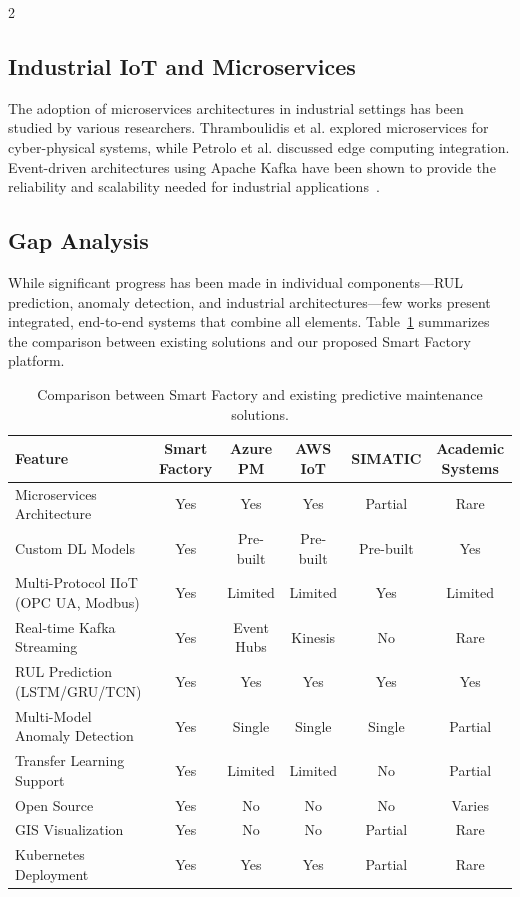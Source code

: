 \documentclass{ijceds} %
\begin{document}
\begin{multicols}{2}
\subsection{Industrial IoT and Microservices}

The adoption of microservices architectures in industrial settings has been studied by various researchers. Thramboulidis et al.\cite{thramboulidis2018cyberphysical} explored microservices for cyber-physical systems, while Petrolo et al.\cite{petrolo2017towards} discussed edge computing integration. Event-driven architectures using Apache Kafka have been shown to provide the reliability and scalability needed for industrial applications~\cite{confluent2021kafka}.

\subsection{Gap Analysis}

While significant progress has been made in individual components—RUL prediction, anomaly detection, and industrial architectures—few works present integrated, end-to-end systems that combine all elements. Table~\ref{tab:comparison} summarizes the comparison between existing solutions and our proposed Smart Factory platform.

\begin{table}[t]
\centering
\caption{Comparison between Smart Factory and existing predictive maintenance solutions.}
\label{tab:comparison}
\scriptsize
\begin{tabular}{|p{4.5cm}|c|c|c|c|c|}
\hline
\textbf{Feature} & \textbf{Smart Factory} & \textbf{Azure PM\footnotemark[1]} & \textbf{AWS IoT\footnotemark[2]} & \textbf{SIMATIC\footnotemark[3]} & \textbf{Academic Systems} \\ \hline
Microservices Architecture & Yes & Yes & Yes & Partial & Rare \\ \hline
Custom DL Models & Yes & Pre-built & Pre-built & Pre-built & Yes \\ \hline
Multi-Protocol IIoT (OPC UA, Modbus) & Yes & Limited & Limited & Yes & Limited \\ \hline
Real-time Kafka Streaming & Yes & Event Hubs & Kinesis & No & Rare \\ \hline
RUL Prediction (LSTM/GRU/TCN) & Yes & Yes & Yes & Yes & Yes \\ \hline
Multi-Model Anomaly Detection & Yes & Single & Single & Single & Partial \\ \hline
Transfer Learning Support & Yes & Limited & Limited & No & Partial \\ \hline
Open Source & Yes & No & No & No & Varies \\ \hline
GIS Visualization & Yes & No & No & Partial & Rare \\ \hline
Kubernetes Deployment & Yes & Yes & Yes & Partial & Rare \\ \hline
\end{tabular}
\end{table}


\end{multicols}
\end{document}
